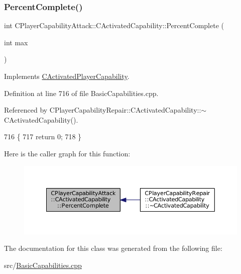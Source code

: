 \hypertarget{classCPlayerCapabilityAttack_1_1CActivatedCapability_a75866109b62de0522622b03137461519}{}\label{classCPlayerCapabilityAttack_1_1CActivatedCapability_a75866109b62de0522622b03137461519} 
\subsubsection{\texorpdfstring{Percent\+Complete()}{PercentComplete()}}
{\footnotesize\ttfamily int C\+Player\+Capability\+Attack\+::\+C\+Activated\+Capability\+::\+Percent\+Complete (\begin{DoxyParamCaption}\item[{int}]{max }\end{DoxyParamCaption})\hspace{0.3cm}{\ttfamily [virtual]}}



Implements \hyperlink{classCActivatedPlayerCapability_a405dc6076058006a4f801727de4cfe4d}{C\+Activated\+Player\+Capability}.



Definition at line 716 of file Basic\+Capabilities.\+cpp.



Referenced by C\+Player\+Capability\+Repair\+::\+C\+Activated\+Capability\+::$\sim$\+C\+Activated\+Capability().


\begin{DoxyCode}
716                                                                        \{
717     \textcolor{keywordflow}{return} 0;
718 \}
\end{DoxyCode}
Here is the caller graph for this function\+:\nopagebreak
\begin{figure}[H]
\begin{center}
\leavevmode
\includegraphics[width=350pt]{classCPlayerCapabilityAttack_1_1CActivatedCapability_a75866109b62de0522622b03137461519_icgraph}
\end{center}
\end{figure}


The documentation for this class was generated from the following file\+:\begin{DoxyCompactItemize}
\item 
src/\hyperlink{BasicCapabilities_8cpp}{Basic\+Capabilities.\+cpp}\end{DoxyCompactItemize}
